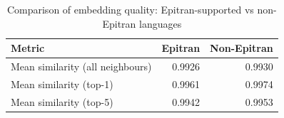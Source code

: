 \begin{table}[htbp]
\centering
\caption{Comparison of embedding quality: Epitran-supported vs non-Epitran languages}
\label{tab:embed-comparison}
\begin{tabular}{lrr}
\toprule
\textbf{Metric} & \textbf{Epitran} & \textbf{Non-Epitran} \\
\midrule
Mean similarity (all neighbours) & 0.9926 & 0.9930 \\
Mean similarity (top-1) & 0.9961 & 0.9974 \\
Mean similarity (top-5) & 0.9942 & 0.9953 \\
\bottomrule
\end{tabular}
\end{table}